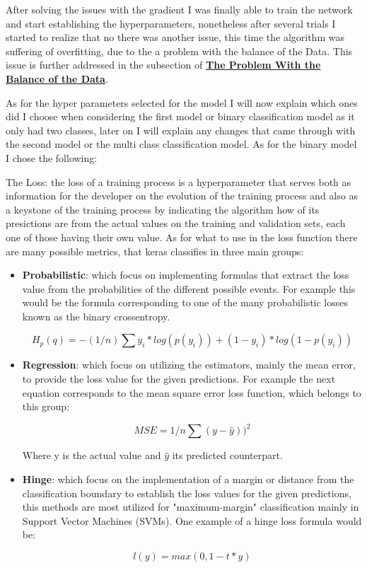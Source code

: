 \documentclass[12pt, a4paper]{article}
\begin{document}
	After solving the issues with the gradient I was finally able to train the network and start establishing the hyperparameters, nonetheless after several trials I started to realize that no there was another issue, this time the algorithm was suffering of overfitting, due to the a problem with the balance of the Data. This issue is further addressed in the subsection of \hyperref[sec:problemUnbalanceData]{\textbf{The Problem With the Balance of the Data}}.
	
	As for the hyper parameters selected for the model I will now explain which ones did I choose when considering the first model or binary classification model as it only had two classes, later on I will explain any changes that came through with the second model or the multi class classification model. As for the binary model I chose the following:
	
	The Loss: the loss of a training process is a hyperparameter that serves both as information for the developer on the evolution of the training process and also as a keystone of the training process by indicating the algorithm how of its presictions are from the actual values on the training and validation sets, each one of those having their own value. As for what to use in the loss function there are many possible metrics, that keras classifies in three main groups:\cite{kerasDocs}
	
	\begin{itemize}
		\item \textbf{Probabilistic}: which focus on implementing formulas that extract the loss value from the probabilities of the different possible events. For example this would be the formula corresponding to one of the many probabilistic losses known as the binary crossentropy.\cite{binnaryCrossentropy}
		
		\[ H_p(q) = -(1/n) \sum y_i * log(p(y_i)) + (1-y_i)*log(1-p(y_i)) \]
		
		\item\textbf{Regression}: which focus on utilizing the estimators, mainly the mean error, to provide the loss value for the given predictions. For example the next equation corresponds to the mean square error loss function, which belongs to this group:
		
		\[ MSE = 1/n \sum(y - \hat y))^2 \]
		
		Where y is the actual value and $\hat y$ its predicted counterpart.
		
		
		\clearpage
		
		\item\textbf{Hinge}: which focus on the implementation of a margin or distance from the classification boundary to establish the loss values for the given predictions, this methods are most utilized for "maximum-margin" classification mainly in Support Vector Machines (SVMs). One example of a hinge loss formula would be:
		
		\[ l(y) = max(0,1 - t * y)\]
		
	\end{itemize}
\end{document}
